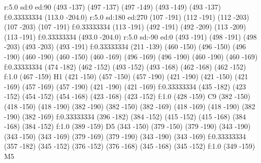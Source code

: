 {\larc r:5.0 sd:0 ed:90
\move (493 -137)
\lvec (497 -137)
\lvec (497 -149)
\lvec (493 -149)
\lvec (493 -137)
\lfill f:0.33333334
\move(113.0 -204.0)
\larc r:5.0 sd:180 ed:270
\move (107 -191)
\lvec (112 -191)
\lvec (112 -203)
\lvec (107 -203)
\lvec (107 -191)
\lfill f:0.33333334
\move (113 -191)
\lvec (492 -191)
\lvec (492 -209)
\lvec (113 -209)
\lvec (113 -191)
\lfill f:0.33333334
\move(493.0 -204.0)
\larc r:5.0 sd:-90 ed:0
\move (493 -191)
\lvec (498 -191)
\lvec (498 -203)
\lvec (493 -203)
\lvec (493 -191)
\lfill f:0.33333334
\htext (211 -139) {\matrixfontselect \color{white}{Array of Random Keys}}
\move (460 -150)
\lvec (496 -150)
\lvec (496 -190)
\lvec (460 -190)
\lvec (460 -150)
\move (460 -169)
\lvec (496 -169)
\lvec (496 -190)
\lvec (460 -190)
\lvec (460 -169)
\lfill f:0.33333334
\htext (474 -182) {\matrixfontselect \color{white}{9}}
\move (462 -152)
\lvec (493 -152)
\lvec (493 -168)
\lvec (462 -168)
\lvec (462 -152)
\lfill f:1.0
\htext (467 -159) {\matrixfontselect H1}
\move (421 -150)
\lvec (457 -150)
\lvec (457 -190)
\lvec (421 -190)
\lvec (421 -150)
\move (421 -169)
\lvec (457 -169)
\lvec (457 -190)
\lvec (421 -190)
\lvec (421 -169)
\lfill f:0.33333334
\htext (435 -182) {\matrixfontselect \color{white}{8}}
\move (423 -152)
\lvec (454 -152)
\lvec (454 -168)
\lvec (423 -168)
\lvec (423 -152)
\lfill f:1.0
\htext (428 -159) {\matrixfontselect C9}
\move (382 -150)
\lvec (418 -150)
\lvec (418 -190)
\lvec (382 -190)
\lvec (382 -150)
\move (382 -169)
\lvec (418 -169)
\lvec (418 -190)
\lvec (382 -190)
\lvec (382 -169)
\lfill f:0.33333334
\htext (396 -182) {\matrixfontselect \color{white}{7}}
\move (384 -152)
\lvec (415 -152)
\lvec (415 -168)
\lvec (384 -168)
\lvec (384 -152)
\lfill f:1.0
\htext (389 -159) {\matrixfontselect D5}
\move (343 -150)
\lvec (379 -150)
\lvec (379 -190)
\lvec (343 -190)
\lvec (343 -150)
\move (343 -169)
\lvec (379 -169)
\lvec (379 -190)
\lvec (343 -190)
\lvec (343 -169)
\lfill f:0.33333334
\htext (357 -182) {\matrixfontselect \color{white}{6}}
\move (345 -152)
\lvec (376 -152)
\lvec (376 -168)
\lvec (345 -168)
\lvec (345 -152)
\lfill f:1.0
\htext (349 -159) {\matrixfontselect M5}
}
